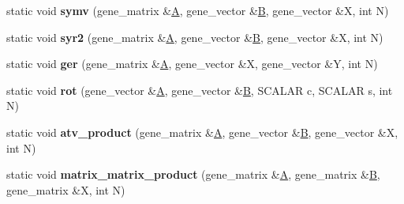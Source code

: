 \begin{DoxyCompactItemize}
static void {\bfseries symv} (gene\+\_\+matrix \&\hyperlink{group___core___module_class_eigen_1_1_matrix}{A}, gene\+\_\+vector \&\hyperlink{group___core___module_class_eigen_1_1_matrix}{B}, gene\+\_\+vector \&X, int N)
\item 
\mbox{\label{classblas__interface_3_01_s_c_a_l_a_r_01_4_a24637e350843e516b274cb03488eaead}} 
static void {\bfseries syr2} (gene\+\_\+matrix \&\hyperlink{group___core___module_class_eigen_1_1_matrix}{A}, gene\+\_\+vector \&\hyperlink{group___core___module_class_eigen_1_1_matrix}{B}, gene\+\_\+vector \&X, int N)
\item 
\mbox{\label{classblas__interface_3_01_s_c_a_l_a_r_01_4_a5ff8e5f7433fc6f2cf309830e5bf4131}} 
static void {\bfseries ger} (gene\+\_\+matrix \&\hyperlink{group___core___module_class_eigen_1_1_matrix}{A}, gene\+\_\+vector \&X, gene\+\_\+vector \&Y, int N)
\item 
\mbox{\label{classblas__interface_3_01_s_c_a_l_a_r_01_4_aadc4b065c56fc4809f9383acda970595}} 
static void {\bfseries rot} (gene\+\_\+vector \&\hyperlink{group___core___module_class_eigen_1_1_matrix}{A}, gene\+\_\+vector \&\hyperlink{group___core___module_class_eigen_1_1_matrix}{B}, S\+C\+A\+L\+AR c, S\+C\+A\+L\+AR s, int N)
\item 
\mbox{\label{classblas__interface_3_01_s_c_a_l_a_r_01_4_ae879d7cef6a168a8bb27f3c36d7e12db}} 
static void {\bfseries atv\+\_\+product} (gene\+\_\+matrix \&\hyperlink{group___core___module_class_eigen_1_1_matrix}{A}, gene\+\_\+vector \&\hyperlink{group___core___module_class_eigen_1_1_matrix}{B}, gene\+\_\+vector \&X, int N)
\item 
\mbox{\label{classblas__interface_3_01_s_c_a_l_a_r_01_4_a5f551c01fee2369ca01cf3f8d4716540}} 
static void {\bfseries matrix\+\_\+matrix\+\_\+product} (gene\+\_\+matrix \&\hyperlink{group___core___module_class_eigen_1_1_matrix}{A}, gene\+\_\+matrix \&\hyperlink{group___core___module_class_eigen_1_1_matrix}{B}, gene\+\_\+matrix \&X, int N)
\item 
\mbox{\label{classblas__interface_3_01_s_c_a_l_a_r_01_4_ab8057556e744cbe8f5da222e8be464a6}} 

\end{DoxyCompactItemize}
